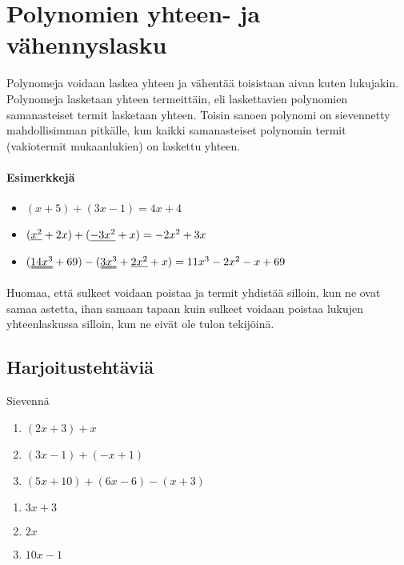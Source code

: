 \chapter{Polynomien yhteen- ja vähennyslasku}

Polynomeja voidaan laskea yhteen ja vähentää toisistaan aivan kuten lukujakin.
Polynomeja lasketaan yhteen termeittäin, eli laskettavien polynomien
samanasteiset termit lasketaan yhteen. Toisin sanoen polynomi on sievennetty
mahdollisimman pitkälle, kun kaikki samanasteiset polynomin termit
(vakiotermit mukaanlukien) on laskettu yhteen.

\subsubsection*{Esimerkkejä}
\begin{itemize}
    \item $(x+5) + (3x-1) = 4x + 4$
    \item $(\uline{x^2} + 2x) + (\uline{-3x^2} + x) = -2x^2 + 3x$
    \item $(\uuline{14x^3} + 69) - (\uuline{3x^3} + \uline{2x^2} + x) = 11x^3 - 2x^2 - x +69$
\end{itemize}

Huomaa, että sulkeet voidaan poistaa ja termit yhdistää silloin, kun ne ovat
samaa astetta, ihan samaan tapaan kuin sulkeet voidaan poistaa lukujen
yhteenlaskussa silloin, kun ne eivät ole tulon tekijöinä.

\section{Harjoitustehtäviä}

\begin{tehtava}
    Sievennä
    \begin{enumerate}
        \item $(2x + 3) + x $
        \item $(3x - 1) + (-x + 1)$
        \item $(5x + 10) + (6x - 6) - (x + 3)$
    \end{enumerate}
    \begin{vastaus}
        \begin{enumerate}
            \item $3x + 3$
            \item $2x$
            \item $10x - 1$
        \end{enumerate}
    \end{vastaus}
\end{tehtava}

